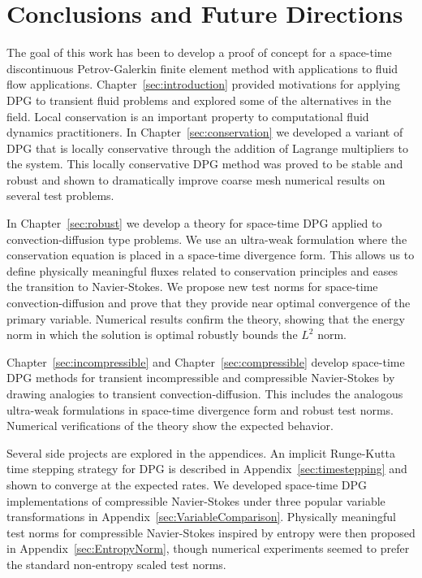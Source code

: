 \documentclass[Dissertation.tex]{subfiles}
\begin{document}
\chapter{Conclusions and Future Directions}

The goal of this work has been to develop a proof of concept for a space-time discontinuous Petrov-Galerkin
finite element method with applications to fluid flow applications.
Chapter~\ref{sec:introduction} provided motivations for applying DPG to transient fluid problems and
explored some of the alternatives in the field.
Local conservation is an important property to computational fluid dynamics practitioners.
In Chapter~\ref{sec:conservation} we developed a variant of DPG that is locally conservative through
the addition of Lagrange multipliers to the system.
This locally conservative DPG method was proved to be stable and robust 
and shown to dramatically improve coarse mesh numerical results on several test problems.

In Chapter~\ref{sec:robust} we develop a theory for space-time DPG applied to convection-diffusion
type problems.
We use an ultra-weak formulation where the conservation equation is placed in a space-time
divergence form. 
This allows us to define physically meaningful fluxes related to conservation principles and eases the transition to Navier-Stokes.
We propose new test norms for space-time convection-diffusion and prove that they provide
near optimal convergence of the primary variable.
Numerical results confirm the theory, showing that the energy norm in which the solution is optimal robustly bounds the $L^2$ norm.

Chapter~\ref{sec:incompressible} and Chapter~\ref{sec:compressible} develop space-time DPG methods 
for transient incompressible and compressible Navier-Stokes
by drawing analogies to transient convection-diffusion. 
This includes the analogous ultra-weak formulations in space-time divergence form
and robust test norms.
Numerical verifications of the theory show the expected behavior.

Several side projects are explored in the appendices. 
An implicit Runge-Kutta time stepping strategy for DPG is described in Appendix~\ref{sec:timestepping}
and shown to converge at the expected rates.
We developed space-time DPG implementations of compressible Navier-Stokes under three popular
variable transformations in Appendix~\ref{sec:VariableComparison}.
Physically meaningful test norms for compressible Navier-Stokes inspired by entropy
were then proposed in Appendix~\ref{sec:EntropyNorm}, though numerical experiments 
seemed to prefer the standard non-entropy scaled test norms.
\end{document}
